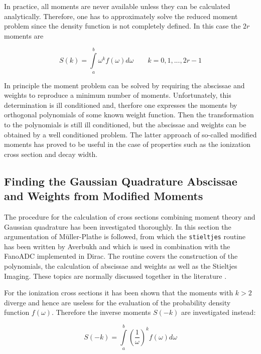 In practice, all moments are never available unless they can be
calculated analytically. Therefore, one has to approximately solve the reduced
moment problem since the density function is not completely defined.
In this case the $2r$ moments are

\begin{equation}
  S(k) = \int\limits_a^b \omega^k f(\omega) d\omega \quad\quad k=0,1,...,2r-1  
\end{equation}

In principle the moment problem can be solved by requiring the abscissae and
weights to reproduce a minimum number of moments. Unfortunately, this determination
is ill conditioned and, therfore one expresses the moments by orthogonal
polynomials of some known weight function. Then the
transformation to the polynomials is still ill conditioned, but the abscissae
and weights can be obtained by a well conditioned problem. \cite{Blumstein73}
The latter approach
of so-called modified moments has proved to be useful in the case of
properties such as the ionization
cross section and decay width.





\subsection{Finding the Gaussian Quadrature Abscissae and Weights from Modified Moments}

The procedure for the calculation of cross sections combining moment
theory and Gaussian quadrature has been investigated thoroughly. In this section
the argumentation of Müller-Plathe \cite{MuellerPlathe90} is followed, from which the
\verb|stieltjes| routine has been written by Averbukh and which is used in
combination with the FanoADC implemented in Dirac. The routine covers 
the construction of the polynomials, the calculation of abscissae and weights as well
as the Stieltjes Imaging. These topics are normally discussed together in the
literature \cite{MuellerPlathe89,Corcoran77,Langhoff76}.

For the ionization cross sections it has been shown that the moments with
$k>2$ diverge and hence are useless for the evaluation of the probability
density function $f(\omega)$. Therefore the inverse moments $S(-k)$ are investigated
instead:

\begin{equation}
  S(-k) = \int\limits_a^b \left( \frac{1}{\omega} \right) ^k f(\omega) d\omega
\end{equation}

